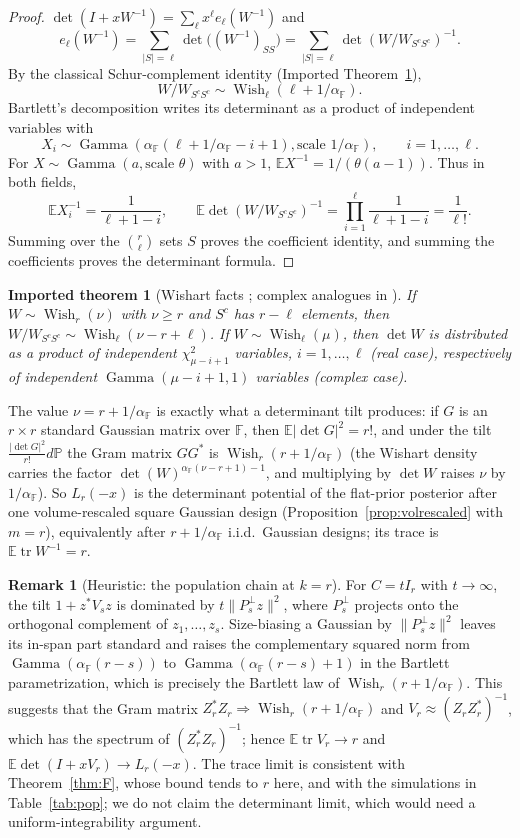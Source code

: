 \documentclass[11pt,a4paper]{article}
\newtheorem{imported}[theorem]{Imported theorem}
\theoremstyle{definition}
\newtheorem{remark}[theorem]{Remark}
\newcommand{\E}{\mathbb{E}}
\newcommand{\PP}{\mathbb{P}}
\newcommand{\F}{\mathbb{F}}
\newcommand{\tr}{\operatorname{tr}}
\newcommand{\Gam}{\operatorname{Gamma}}
\newcommand{\Wish}{\operatorname{Wish}}
\begin{document}
\begin{proof}
$\det(I+xW^{-1})=\sum_\ell x^\ell e_\ell(W^{-1})$ and
\[
e_\ell(W^{-1})=\sum_{|S|=\ell}\det\big((W^{-1})_{SS}\big)=\sum_{|S|=\ell}\det(W/W_{S^cS^c})^{-1}.
\]
By the classical Schur-complement identity (Imported Theorem~\ref{imp:bartlett}),
\[
W/W_{S^cS^c}\sim\Wish_\ell(\ell+1/\alpha_\F).
\]
Bartlett's decomposition writes its determinant as a product of independent variables with
\[
X_i\sim\Gam\left(\alpha_\F(\ell+1/\alpha_\F-i+1),
                 \text{scale }1/\alpha_\F\right),
\qquad i=1,\ldots,\ell.
\]
For $X\sim\Gam(a,\text{scale }\theta)$ with $a>1$, $\E X^{-1}=1/(\theta(a-1))$. Thus in both fields,
\[
\E X_i^{-1}=\frac1{\ell+1-i},\qquad
\E\det(W/W_{S^cS^c})^{-1}
=\prod_{i=1}^{\ell}\frac1{\ell+1-i}=\frac1{\ell!}.
\]
Summing over the $\binom r\ell$ sets $S$ proves the coefficient identity, and summing the coefficients proves the determinant formula.
\end{proof}

\begin{imported}[Wishart facts {\cite[Thms.~3.2.10, 3.2.14]{Muirhead}}; complex analogues in \cite{Goodman}]\label{imp:bartlett}
If $W\sim\Wish_r(\nu)$ with $\nu\ge r$ and $S^c$ has $r-\ell$ elements, then $W/W_{S^cS^c}\sim\Wish_\ell(\nu-r+\ell)$. If $W\sim\Wish_\ell(\mu)$, then $\det W$ is distributed as a product of independent $\chi^2_{\mu-i+1}$ variables, $i=1,\dots,\ell$ (real case), respectively of independent $\Gam(\mu-i+1,1)$ variables (complex case).
\end{imported}

The value $\nu=r+1/\alpha_\F$ is exactly what a determinant tilt produces: if $G$ is an $r\times r$ standard Gaussian matrix over $\F$, then $\E|\det G|^2=r!$, and under the tilt $\frac{|\det G|^2}{r!}d\PP$ the Gram matrix $GG^*$ is $\Wish_r(r+1/\alpha_\F)$ (the Wishart density carries the factor $\det(W)^{\alpha_\F(\nu-r+1)-1}$, and multiplying by $\det W$ raises $\nu$ by $1/\alpha_\F$). So $L_r(-x)$ is the determinant potential of the flat-prior posterior after one volume-rescaled square Gaussian design (Proposition~\ref{prop:volrescaled} with $m=r$), equivalently after $r+1/\alpha_\F$ i.i.d.\ Gaussian designs; its trace is $\E\tr W^{-1}=r$.

\begin{remark}[Heuristic: the population chain at $k=r$]\label{rem:bartlettheur}
For $C=tI_r$ with $t\to\infty$, the tilt $1+z^*V_sz$ is dominated by $t\|P_s^\perp z\|^2$, where $P_s^\perp$ projects onto the orthogonal complement of $z_1,\dots,z_s$. Size-biasing a Gaussian by $\|P_s^\perp z\|^2$ leaves its in-span part standard and raises the complementary squared norm from $\Gam(\alpha_\F(r-s))$ to $\Gam(\alpha_\F(r-s)+1)$ in the Bartlett parametrization, which is precisely the Bartlett law of $\Wish_r(r+1/\alpha_\F)$. This suggests that the Gram matrix $Z_r^*Z_r\Rightarrow\Wish_r(r+1/\alpha_\F)$ and $V_r\approx(Z_rZ_r^*)^{-1}$, which has the spectrum of $(Z_r^*Z_r)^{-1}$; hence $\E\tr V_r\to r$ and $\E\det(I+xV_r)\to L_r(-x)$. The trace limit is consistent with Theorem~\ref{thm:F}, whose bound tends to $r$ here, and with the simulations in Table~\ref{tab:pop}; we do not claim the determinant limit, which would need a uniform-integrability argument.
\end{remark}
\end{document}

